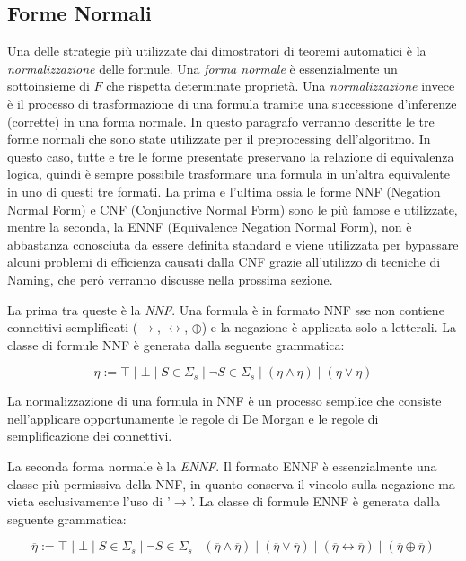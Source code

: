 \documentclass[./main.tex]{subfiles}
\begin{document}

\subsection{Forme Normali} \label{sec:forme_normali}
Una delle strategie più utilizzate dai dimostratori di teoremi automatici è la \textit{normalizzazione} delle formule. Una \textit{forma normale}
è essenzialmente un sottoinsieme di $F$ che rispetta determinate proprietà. Una \textit{normalizzazione} invece è il processo di trasformazione di una formula
tramite una successione d'inferenze (corrette) in una forma normale.
In questo paragrafo verranno descritte le tre forme normali che sono state utilizzate per il preprocessing
dell'algoritmo. In questo caso, tutte e tre le forme presentate preservano la relazione di equivalenza logica, quindi è sempre possibile
trasformare una formula in un'altra equivalente in uno di questi tre formati. 
La prima e l'ultima ossia le forme NNF (Negation Normal Form) e CNF (Conjunctive Normal Form) sono le più famose e utilizzate, mentre la seconda, la ENNF (Equivalence Negation Normal Form), non è abbastanza conosciuta da essere definita standard
e viene utilizzata per bypassare alcuni problemi di efficienza causati dalla CNF grazie all'utilizzo di tecniche di Naming, che però verranno discusse nella prossima sezione.

La prima tra queste è la \textit{NNF}. Una formula è in formato NNF 
sse non contiene connettivi semplificati ($\rightarrow$, $\leftrightarrow$, $\oplus$) e la negazione è applicata solo a letterali. La classe di formule 
NNF è generata dalla seguente grammatica:

$$ \eta := \top \mid \bot \mid S \in \Sigma_s \mid \lnot S \in \Sigma_s \mid (\eta \land \eta) \mid (\eta \lor \eta ) $$

La normalizzazione di una formula in NNF è un processo semplice che consiste nell'applicare opportunamente 
le regole di De Morgan e le regole di semplificazione dei connettivi.

La seconda forma normale è la \textit{ENNF}. 
Il formato ENNF è essenzialmente una classe più permissiva della NNF, in quanto conserva il vincolo sulla negazione ma 
vieta esclusivamente l'uso di '$\rightarrow$'. La classe di formule ENNF è generata dalla seguente grammatica:
 
$$ \overline{\eta}  := \top \mid \bot \mid S \in \Sigma_s \mid \lnot S \in \Sigma_s \mid (\overline{\eta} \land \overline{\eta}) \mid (\overline{\eta} \lor \overline{\eta} ) \mid (\overline{\eta} \leftrightarrow \overline{\eta}) \mid (\overline{\eta} \oplus \overline{\eta}) $$
\end{document}
